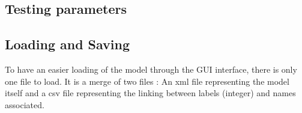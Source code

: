 \subsection{Testing parameters}

\subsection{Loading and Saving}
To have an easier loading of the model through the GUI interface, there is only one file to load. It is a merge of two files : An xml file representing the model itself and a csv file representing the linking between labels (integer) and names associated.
